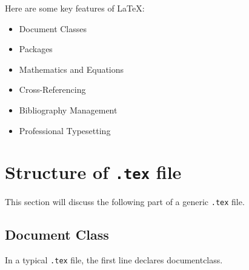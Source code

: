 \documentclass[12pt, a4paper]{article}
\begin{document}
Here are some key features of \LaTeX:
\begin{itemize}
    \item {Document Classes}%

    \item {Packages}%

    \item {Mathematics and Equations}%

    \item {Cross-Referencing}%

    \item {Bibliography Management}%

    \item {Professional Typesetting}%
\end{itemize}

\section{Structure of \texttt{.tex} file}

This section will discuss the following part of a generic \texttt{.tex} file.

\subsection{Document Class}

In a typical \verb|.tex| file, the first line declares documentclass. 
\end{document}

